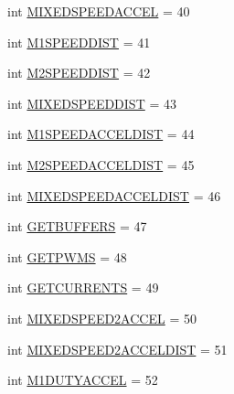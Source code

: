 \begin{DoxyCompactItemize}
\item 
int \mbox{\hyperlink{classtoxic__hardware_1_1roboclaw__3_1_1Roboclaw_1_1Cmd_a82e0b8aeb9dbe61026cf78cb735896ed}{M\+I\+X\+E\+D\+S\+P\+E\+E\+D\+A\+C\+C\+EL}} = 40
\item 
int \mbox{\hyperlink{classtoxic__hardware_1_1roboclaw__3_1_1Roboclaw_1_1Cmd_a54084848c0ae9f5add632435e1a229f3}{M1\+S\+P\+E\+E\+D\+D\+I\+ST}} = 41
\item 
int \mbox{\hyperlink{classtoxic__hardware_1_1roboclaw__3_1_1Roboclaw_1_1Cmd_af091fabf404cd34e798e548bf28be6b5}{M2\+S\+P\+E\+E\+D\+D\+I\+ST}} = 42
\item 
int \mbox{\hyperlink{classtoxic__hardware_1_1roboclaw__3_1_1Roboclaw_1_1Cmd_a51d5b7c859d6561979f84196efc1d8de}{M\+I\+X\+E\+D\+S\+P\+E\+E\+D\+D\+I\+ST}} = 43
\item 
int \mbox{\hyperlink{classtoxic__hardware_1_1roboclaw__3_1_1Roboclaw_1_1Cmd_af4c639c6384cb28c9ccd7f485d33f1ba}{M1\+S\+P\+E\+E\+D\+A\+C\+C\+E\+L\+D\+I\+ST}} = 44
\item 
int \mbox{\hyperlink{classtoxic__hardware_1_1roboclaw__3_1_1Roboclaw_1_1Cmd_aabffdf61dd14127d3a0c9f4d308e7ef7}{M2\+S\+P\+E\+E\+D\+A\+C\+C\+E\+L\+D\+I\+ST}} = 45
\item 
int \mbox{\hyperlink{classtoxic__hardware_1_1roboclaw__3_1_1Roboclaw_1_1Cmd_a063d45bcdea4caa85ae6d96c6cbc285f}{M\+I\+X\+E\+D\+S\+P\+E\+E\+D\+A\+C\+C\+E\+L\+D\+I\+ST}} = 46
\item 
int \mbox{\hyperlink{classtoxic__hardware_1_1roboclaw__3_1_1Roboclaw_1_1Cmd_aa1ca8947a935cedd12e73d6a27f36784}{G\+E\+T\+B\+U\+F\+F\+E\+RS}} = 47
\item 
int \mbox{\hyperlink{classtoxic__hardware_1_1roboclaw__3_1_1Roboclaw_1_1Cmd_a59d182a4a8b89af28f61c2d3248182b9}{G\+E\+T\+P\+W\+MS}} = 48
\item 
int \mbox{\hyperlink{classtoxic__hardware_1_1roboclaw__3_1_1Roboclaw_1_1Cmd_acbb53759ce7155f8d72fe63bd1091f52}{G\+E\+T\+C\+U\+R\+R\+E\+N\+TS}} = 49
\item 
int \mbox{\hyperlink{classtoxic__hardware_1_1roboclaw__3_1_1Roboclaw_1_1Cmd_a96faaada7a7820c46a2715e4cebf8231}{M\+I\+X\+E\+D\+S\+P\+E\+E\+D2\+A\+C\+C\+EL}} = 50
\item 
int \mbox{\hyperlink{classtoxic__hardware_1_1roboclaw__3_1_1Roboclaw_1_1Cmd_afdfddbb75c888bba6b7a516a3edf1f19}{M\+I\+X\+E\+D\+S\+P\+E\+E\+D2\+A\+C\+C\+E\+L\+D\+I\+ST}} = 51
\item 
int \mbox{\hyperlink{classtoxic__hardware_1_1roboclaw__3_1_1Roboclaw_1_1Cmd_a4336e315d03abb963303204e46df39a7}{M1\+D\+U\+T\+Y\+A\+C\+C\+EL}} = 52

\end{DoxyCompactItemize}
